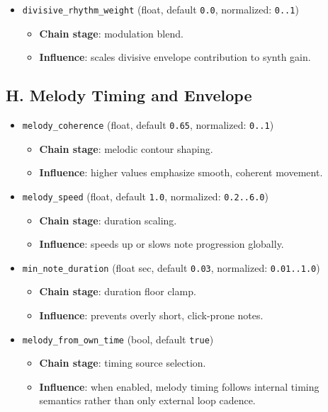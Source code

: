 \documentclass[11pt,a4paper]{article}
\begin{document}
\begin{itemize}
  \item \texttt{divisive\_rhythm\_weight} (float, default \texttt{0.0}, normalized: \texttt{0..1})
  \begin{itemize}
    \item \textbf{Chain stage}: modulation blend.
    \item \textbf{Influence}: scales divisive envelope contribution to synth gain.
  \end{itemize}
\end{itemize}

\subsection*{H. Melody Timing and Envelope}
\begin{itemize}
  \item \texttt{melody\_coherence} (float, default \texttt{0.65}, normalized: \texttt{0..1})
  \begin{itemize}
    \item \textbf{Chain stage}: melodic contour shaping.
    \item \textbf{Influence}: higher values emphasize smooth, coherent movement.
  \end{itemize}

  \item \texttt{melody\_speed} (float, default \texttt{1.0}, normalized: \texttt{0.2..6.0})
  \begin{itemize}
    \item \textbf{Chain stage}: duration scaling.
    \item \textbf{Influence}: speeds up or slows note progression globally.
  \end{itemize}

  \item \texttt{min\_note\_duration} (float sec, default \texttt{0.03}, normalized: \texttt{0.01..1.0})
  \begin{itemize}
    \item \textbf{Chain stage}: duration floor clamp.
    \item \textbf{Influence}: prevents overly short, click-prone notes.
  \end{itemize}

  \item \texttt{melody\_from\_own\_time} (bool, default \texttt{true})
  \begin{itemize}
    \item \textbf{Chain stage}: timing source selection.
    \item \textbf{Influence}: when enabled, melody timing follows internal timing semantics rather than only external loop cadence.
  \end{itemize}


\end{itemize}
\end{document}
